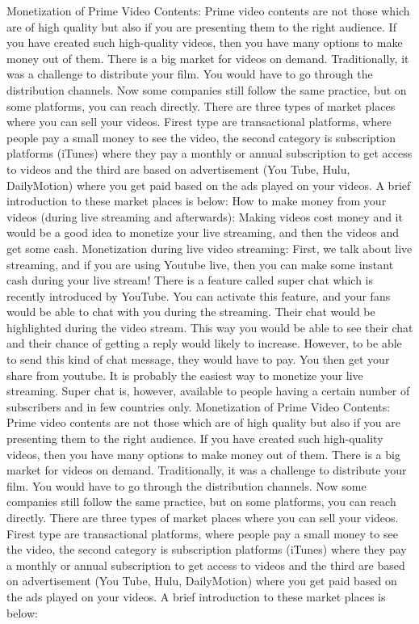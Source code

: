\documentclass[]{book}
\begin{document}
Monetization of Prime Video Contents:
Prime video contents are not those which are of high quality but also if you are presenting them to the right audience.  If you have created such high-quality videos, then you have many options to make money out of them.  There is a big market for videos on demand. Traditionally, it was a challenge to distribute your film. You would have to go through the distribution channels. Now some companies still follow the same practice, but on some platforms, you can reach directly. There are three types of market places where you can sell your videos. Firest type are transactional platforms, where people pay a small money to see the video, the second category is subscription platforms (iTunes) where they pay a monthly or annual subscription to get access to videos and the third are based on advertisement (You Tube, Hulu, DailyMotion) where you get paid based on the ads played on your videos. A brief introduction to these market places is below:
How to make money from your videos (during live streaming and afterwards):
Making videos cost money and it would be a good idea to monetize your live streaming, and then the videos and get some cash.
Monetization during live video streaming:
First, we talk about live streaming, and if you are using Youtube live, then you can make some instant cash during your live stream! There is a feature called super chat which is recently introduced by YouTube.  You can activate this feature, and your fans would be able to chat with you during the streaming. Their chat would be highlighted during the video stream. This way you would be able to see their chat and their chance of getting a reply would likely to increase. However,  to be able to send this kind of chat message, they would have to pay.  You then get your share from youtube. It is probably the easiest way to monetize your live streaming. Super chat is, however, available to people having a certain number of subscribers and in few countries only.
Monetization of Prime Video Contents:
Prime video contents are not those which are of high quality but also if you are presenting them to the right audience.  If you have created such high-quality videos, then you have many options to make money out of them.  There is a big market for videos on demand. Traditionally, it was a challenge to distribute your film. You would have to go through the distribution channels. Now some companies still follow the same practice, but on some platforms, you can reach directly. There are three types of market places where you can sell your videos. Firest type are transactional platforms, where people pay a small money to see the video, the second category is subscription platforms (iTunes) where they pay a monthly or annual subscription to get access to videos and the third are based on advertisement (You Tube, Hulu, DailyMotion) where you get paid based on the ads played on your videos. A brief introduction to these market places is below:
\end{document}
